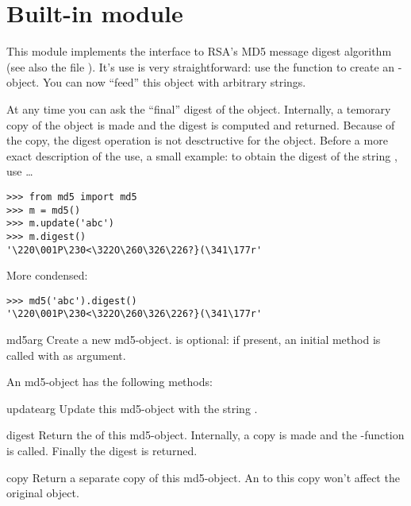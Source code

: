\section{Built-in module }

This module implements the interface to RSA's MD5 message digest
algorithm (see also the file ). It's use is very
straightforward: use the function  to create an
-object. You can now ``feed'' this object with arbitrary
strings.

At any time you can ask the ``final'' digest of the object. Internally,
a temorary copy of the object is made and the digest is computed and
returned. Because of the copy, the digest operation is not desctructive
for the object. Before a more exact description of the use, a small
example: to obtain the digest of the string , use \ldots

\bcode\begin{verbatim}
>>> from md5 import md5
>>> m = md5()
>>> m.update('abc')
>>> m.digest()
'\220\001P\230<\322O\260\326\226?}(\341\177r'
\end{verbatim}\ecode

More condensed:

\bcode\begin{verbatim}
>>> md5('abc').digest()
'\220\001P\230<\322O\260\326\226?}(\341\177r'
\end{verbatim}\ecode

\renewcommand{\indexsubitem}{(in module md5)}
\begin{funcdesc}{md5}{arg}
  Create a new md5-object.  is optional: if present, an initial
   method is called with  as argument.
\end{funcdesc}

An md5-object has the following methods:

\renewcommand{\indexsubitem}{(md5 method)}
\begin{funcdesc}{update}{arg}
  Update this md5-object with the string .
\end{funcdesc}

\begin{funcdesc}{digest}{}
  Return the  of this md5-object. Internally, a copy is made
  and the \C-function  is called. Finally the digest is
  returned.
\end{funcdesc}

\begin{funcdesc}{copy}{}
  Return a separate copy of this md5-object.  An  to this
  copy won't affect the original object.
\end{funcdesc}

